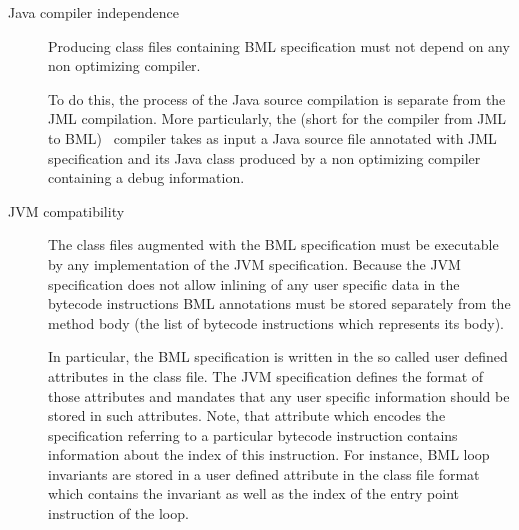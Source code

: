 \begin{description}

\item [Java compiler independence ] 
      Producing class files containing BML specification must not depend on 
      any non optimizing compiler. 
    
      To do this, the process of the Java source compilation is separate from the JML compilation. 
      More particularly, the \JMLtoBML (short for the compiler from JML to BML) \ compiler  takes as input a Java source file annotated with JML
      specification and its Java class produced by a non optimizing compiler containing a
      debug information.%
      

\item [JVM compatibility]
            The class files augmented with the BML specification must be executable by any
	    implementation of the JVM specification.
	     Because the JVM specification does not allow inlining of any user specific data in the bytecode instructions 
	    BML annotations must be stored separately from the method body (the list of bytecode instructions which represents its body).
	  
	    
	    In particular, the BML specification is written in the so
	    called user defined attributes in the class file.
	    The JVM specification defines the format of those attributes and mandates that any
	    user specific information should be stored in such attributes. 
	    Note, that attribute which encodes the specification  referring to a particular bytecode instruction contains
	    information about the index of this instruction. For instance,  BML loop invariants
	    are stored in a user defined attribute in the class file format which  contains the invariant
	    as well as the index of the entry point instruction of the loop.
	    

\end{description}
